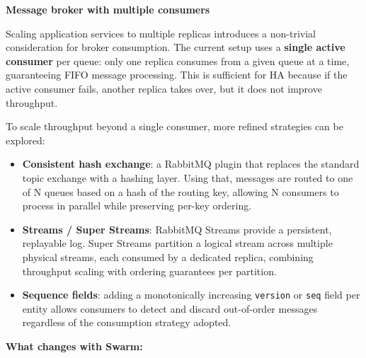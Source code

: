 \medskip
\noindent\textbf{Message broker with multiple consumers}

Scaling application services to multiple replicas introduces a non-trivial consideration for broker consumption. The current setup uses a \textbf{single active consumer} per queue: only one replica consumes from a given queue at a time, guaranteeing FIFO message processing. This is sufficient for HA because if the active consumer fails, another replica takes over, but it does not improve throughput.

To scale throughput beyond a single consumer, more refined strategies can be explored:

\begin{itemize}
  \item \textbf{Consistent hash exchange}: a RabbitMQ plugin that replaces the standard topic exchange with a hashing layer. Using that, messages are routed to one of N queues based on a hash of the routing key, allowing N consumers to process in parallel while preserving per-key ordering.
  \item \textbf{Streams / Super Streams}: RabbitMQ Streams provide a persistent, replayable log. Super Streams partition a logical stream across multiple physical streams, each consumed by a dedicated replica, combining throughput scaling with ordering guarantees per partition.
  \item \textbf{Sequence fields}: adding a monotonically increasing \texttt{version} or \texttt{seq} field per entity allows consumers to detect and discard out-of-order messages regardless of the consumption strategy adopted.
\end{itemize}

\noindent\textbf{What changes with Swarm:}


